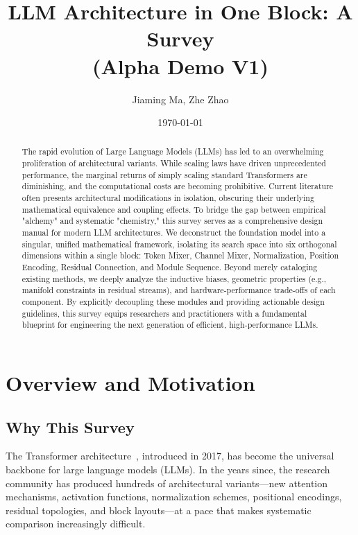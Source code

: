 \documentclass[11pt, a4paper]{article}
\title{
\textbf{
LLM Architecture in One Block: A Survey \\
(Alpha Demo V1)
}
}
\author{Jiaming Ma, Zhe Zhao}
\date{\today}
\begin{document}
\maketitle

\begin{abstract}
The rapid evolution of Large Language Models (LLMs) has led to an overwhelming proliferation of architectural variants. While scaling laws have driven unprecedented performance, the marginal returns of simply scaling standard Transformers are diminishing, and the computational costs are becoming prohibitive. Current literature often presents architectural modifications in isolation, obscuring their underlying mathematical equivalence and coupling effects. To bridge the gap between empirical "alchemy" and systematic "chemistry," this survey serves as a comprehensive design manual for modern LLM architectures. We deconstruct the foundation model into a singular, unified mathematical framework, isolating its search space into six orthogonal dimensions within a single block: Token Mixer, Channel Mixer, Normalization, Position Encoding, Residual Connection, and Module Sequence. Beyond merely cataloging existing methods, we deeply analyze the inductive biases, geometric properties (e.g., manifold constraints in residual streams), and hardware-performance trade-offs of each component. By explicitly decoupling these modules and providing actionable design guidelines, this survey equips researchers and practitioners with a fundamental blueprint for engineering the next generation of efficient, high-performance LLMs.
\end{abstract}

\newpage
\tableofcontents
\newpage

\section*{Overview and Motivation}

\subsection*{Why This Survey}

The Transformer architecture~\cite{vaswani2017attention}, introduced in 2017, has become the universal backbone for large language models (LLMs).
In the years since, the research community has produced hundreds of architectural variants---new attention mechanisms, activation functions, normalization schemes, positional encodings, residual topologies, and block layouts---at a pace that makes systematic comparison increasingly difficult.
\end{document}
